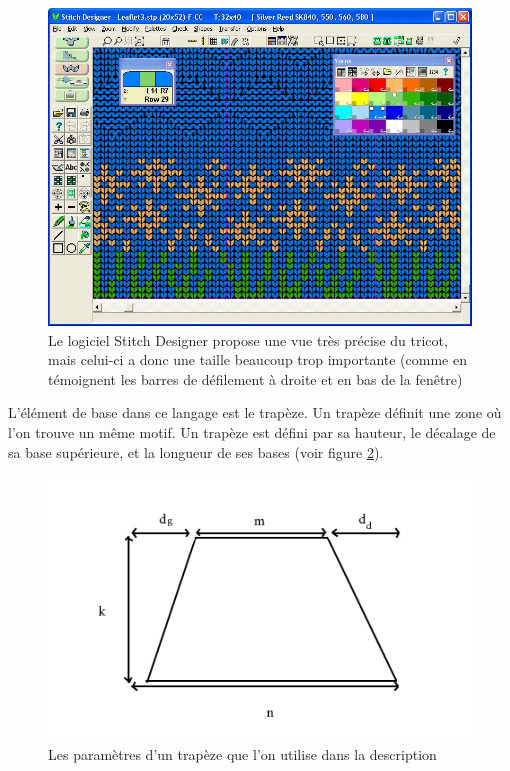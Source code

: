 \documentclass{article}
\begin{document}
\begin{figure}[!ht]
  \centering \includegraphics[scale=0.3]{../img/grid.jpg}
  \caption{Le logiciel Stitch Designer propose une vue très précise du
    tricot, mais celui-ci a donc une taille beaucoup trop importante
    (comme en témoignent les barres de défilement à droite et en bas
    de la fenêtre)}
  \label{logiciel}
\end{figure}

L'élément de base dans ce langage est le trapèze. Un trapèze définit
une zone où l'on trouve un même motif. Un trapèze est défini par sa
hauteur, le décalage de sa base supérieure, et la longueur de ses
bases (voir figure \ref{trapeze}).

\begin{figure}[!ht]
  \centering \includegraphics[scale=0.5]{../img/trapeze.jpg}
  \caption{Les paramètres d'un trapèze que l'on utilise dans la
    description}
  \label{trapeze}
\end{figure}
\end{document}
